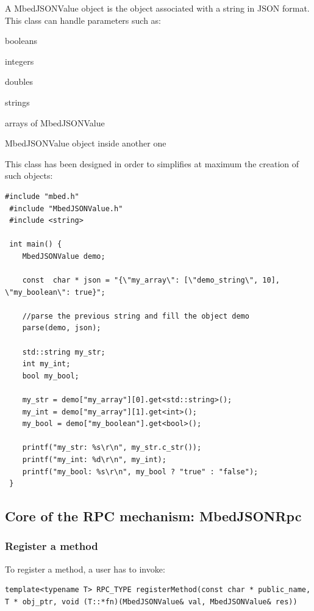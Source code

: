 \documentclass[pdftex,10pt,a4paper]{report}
\newenvironment{packed_item}{
\begin{itemize}
  \setlength{\itemsep}{1pt}
  \setlength{\parskip}{0pt}
  \setlength{\parsep}{0pt}
}{\end{itemize}}
\begin{document}
A MbedJSONValue object is the object associated with a string in JSON format. This class can handle parameters such as:
\begin{packed_item}
	\item booleans
	\item integers
	\item doubles
	\item strings
	\item arrays of MbedJSONValue
	\item MbedJSONValue object inside another one
\end{packed_item}

This class has been designed in order to simplifies at maximum the creation of such objects:

\begin{lstlisting}[label=MbedJSONValue manipulation,caption=MbedJSONValue manipulation]
 #include "mbed.h"
 #include "MbedJSONValue.h"
 #include <string>

 int main() {     
    MbedJSONValue demo;

    const  char * json = "{\"my_array\": [\"demo_string\", 10], \"my_boolean\": true}";

    //parse the previous string and fill the object demo
    parse(demo, json);

    std::string my_str;
    int my_int;
    bool my_bool;

    my_str = demo["my_array"][0].get<std::string>();
    my_int = demo["my_array"][1].get<int>();
    my_bool = demo["my_boolean"].get<bool>();
   
    printf("my_str: %s\r\n", my_str.c_str());
    printf("my_int: %d\r\n", my_int);
    printf("my_bool: %s\r\n", my_bool ? "true" : "false");
 }
   \end{lstlisting}

\subsection{Core of the RPC mechanism: MbedJSONRpc}
\subsubsection{Register a method}
To register a method, a user has to invoke:
\begin{lstlisting}[label=Register a method,caption=Register a method]
template<typename T> RPC_TYPE registerMethod(const char * public_name, T * obj_ptr, void (T::*fn)(MbedJSONValue& val, MbedJSONValue& res))
\end{lstlisting}
\end{document}
